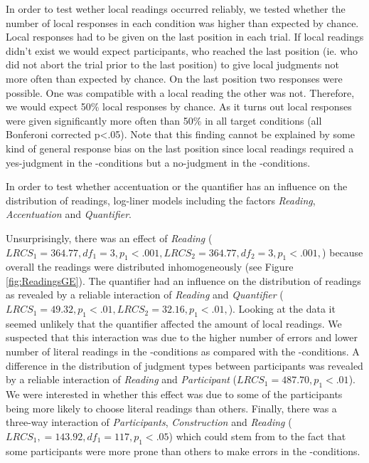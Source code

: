\documentclass[fleqn,reqno,10pt,draft]{article}
\newcommand{\as}{\acro{as}}
\renewcommand{\es}{\acro{es}}
\begin{document}
In order to test wether local readings occurred reliably, we tested whether the
number of local responses in each condition was higher than expected
by chance. Local responses had to be given on the last position in
each trial. If local readings didn't exist we would expect
participants, who reached the last position (ie. who did not abort the
trial prior to the last position) to give local judgments not more
often than expected by chance. On the last position two responses were
possible. One was compatible with a local reading the other was
not. Therefore, we would expect 50\% local responses by chance. As it
turns out local responses were given significantly more often than
50\% in all target conditions (all Bonferoni corrected p<.05). Note
that this finding cannot be explained by some kind of general response
bias on the last position since local readings required a yes-judgment
in the \es-conditions but a no-judgment in the \as-conditions.


In order to test whether accentuation or the quantifier has an
influence on the distribution of readings, log-liner models 
including the factors {\it Reading}, {\it Accentuation} and 
{\it Quantifier}. 

Unsurprisingly, there was an effect of \emph{Reading} ($LRCS_1=364.77,
df_1 = 3, p_1<.001, LRCS_2=364.77, df_2 = 3, p_1<.001,$) because
overall the readings were distributed inhomogeneously (see Figure
\ref{fig:ReadingsGE}). The quantifier had an influence on the
distribution of readings as revealed by a reliable interaction of {\it
  Reading} and {\it Quantifier} ($LRCS_1=49.32, p_1<.01,LRCS_2=32.16,
p_1<.01,$). Looking at the data it seemed unlikely that the quantifier
affected the amount of local readings. We suspected that this
interaction was due to the higher number of errors and lower number of
literal readings in the \es-conditions as compared with the
\as-conditions. A difference in the distribution of judgment types
between participants was revealed by a reliable interaction of {\it
  Reading} and {\it Participant} ($LRCS_1=487.70, p_1<.01$). We were
interested in whether this effect was due to some of the participants
being more likely to choose literal readings than others. Finally,
there was a three-way interaction of {\it Participants}, {\it
  Construction} and {\it Reading} ($LRCS_1, = 143.92, df_1 = 117,
p_1<.05$) which could stem from to the fact that some participants
were more prone than others to make errors in the \es-conditions.
\end{document}
